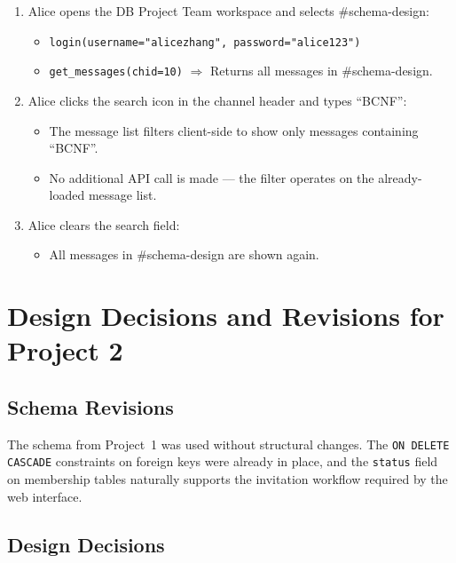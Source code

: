 \documentclass[11pt]{article}
\begin{document}
\begin{enumerate}
    \item Alice opens the DB Project Team workspace and selects \#schema-design:
    \begin{itemize}
        \item \texttt{login(username="alicezhang", password="alice123")}
        \item \texttt{get\_messages(chid=10)} $\Rightarrow$ Returns all messages in \#schema-design.
    \end{itemize}

    \item Alice clicks the search icon in the channel header and types ``BCNF'':
    \begin{itemize}
        \item The message list filters client-side to show only messages containing ``BCNF''.
        \item No additional API call is made --- the filter operates on the already-loaded message list.
    \end{itemize}

    \item Alice clears the search field:
    \begin{itemize}
        \item All messages in \#schema-design are shown again.
    \end{itemize}
\end{enumerate}


\newpage
\section{Design Decisions and Revisions for Project 2}
\label{sec:revisions}

\subsection{Schema Revisions}

The schema from Project~1 was used without structural changes. The \texttt{ON DELETE CASCADE} constraints on foreign keys were already in place, and the \texttt{status} field on membership tables naturally supports the invitation workflow required by the web interface.

\subsection{Design Decisions}
\end{document}
